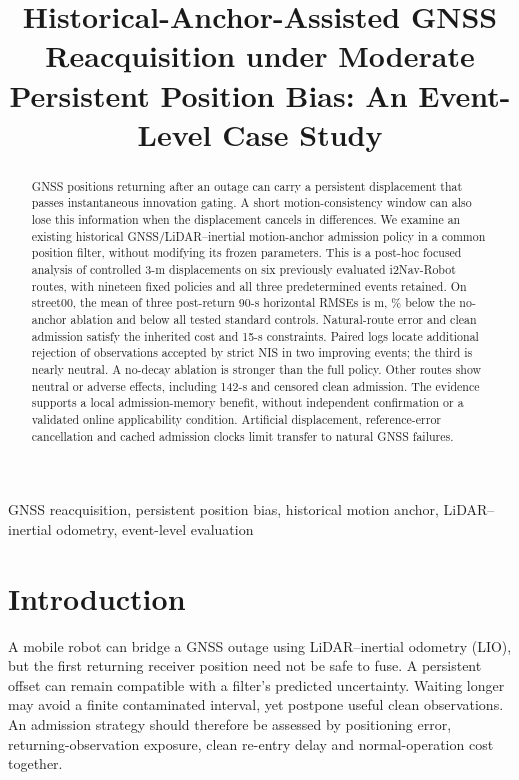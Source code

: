 \documentclass[conference]{IEEEtran}
\title{Historical-Anchor-Assisted GNSS Reacquisition under Moderate Persistent Position Bias: An Event-Level Case Study}
\author{\IEEEauthorblockN{Tutor-review manuscript}\IEEEauthorblockA{Author metadata awaiting human confirmation}}
\begin{document}
\maketitle
\begin{abstract}
GNSS positions returning after an outage can carry a persistent displacement that passes instantaneous innovation gating. A short motion-consistency window can also lose this information when the displacement cancels in differences. We examine an existing historical GNSS/LiDAR--inertial motion-anchor admission policy in a common position filter, without modifying its frozen parameters. This is a post-hoc focused analysis of controlled 3-m displacements on six previously evaluated i2Nav-Robot routes, with nineteen fixed policies and all three predetermined events retained. On street00, the mean of three post-return 90-s horizontal RMSEs is  m, \% below the no-anchor ablation and below all tested standard controls. Natural-route error and clean admission satisfy the inherited cost and 15-s constraints. Paired logs locate additional rejection of observations accepted by strict NIS in two improving events; the third is nearly neutral. A no-decay ablation is stronger than the full policy. Other routes show neutral or adverse effects, including 142-s and censored clean admission. The evidence supports a local admission-memory benefit, without independent confirmation or a validated online applicability condition. Artificial displacement, reference-error cancellation and cached admission clocks limit transfer to natural GNSS failures.
\end{abstract}
\begin{IEEEkeywords}GNSS reacquisition, persistent position bias, historical motion anchor, LiDAR--inertial odometry, event-level evaluation\end{IEEEkeywords}

\section{Introduction}
A mobile robot can bridge a GNSS outage using LiDAR--inertial odometry (LIO), but the first returning receiver position need not be safe to fuse. A persistent offset can remain compatible with a filter's predicted uncertainty. Waiting longer may avoid a finite contaminated interval, yet postpone useful clean observations. An admission strategy should therefore be assessed by positioning error, returning-observation exposure, clean re-entry delay and normal-operation cost together.
\end{document}
